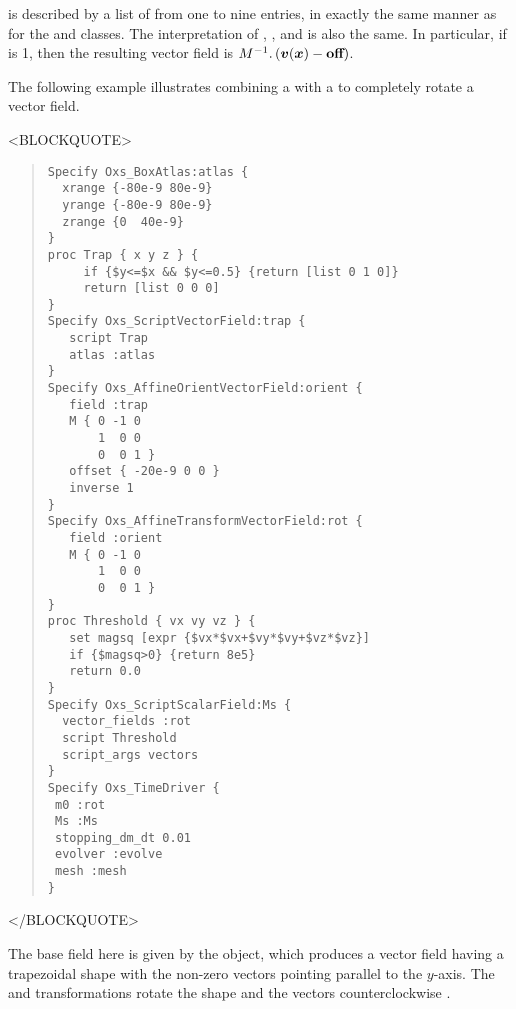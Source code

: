 \begin{description}
 is described by a list of from one to nine entries, in exactly
the same manner as for the
and
classes.  The
interpretation of , , and
 is also the same.  In particular, if
 is 1, then the resulting vector field is
$M^{-1}.\left(\mbox{\boldmath$v$}(\mbox{\boldmath$x$})-\textbf{off}\right)$.

The following example illustrates combining a
 with a
to completely rotate a vector field.
\begin{rawhtml}<BLOCKQUOTE>\end{rawhtml}
\begin{quote}
\begin{verbatim}
Specify Oxs_BoxAtlas:atlas {
  xrange {-80e-9 80e-9}
  yrange {-80e-9 80e-9}
  zrange {0  40e-9}
}
proc Trap { x y z } {
     if {$y<=$x && $y<=0.5} {return [list 0 1 0]}
     return [list 0 0 0]
}
Specify Oxs_ScriptVectorField:trap {
   script Trap
   atlas :atlas
}
Specify Oxs_AffineOrientVectorField:orient {
   field :trap
   M { 0 -1 0
       1  0 0
       0  0 1 }
   offset { -20e-9 0 0 }
   inverse 1
}
Specify Oxs_AffineTransformVectorField:rot {
   field :orient
   M { 0 -1 0
       1  0 0
       0  0 1 }
}
proc Threshold { vx vy vz } {
   set magsq [expr {$vx*$vx+$vy*$vy+$vz*$vz}]
   if {$magsq>0} {return 8e5}
   return 0.0
}
Specify Oxs_ScriptScalarField:Ms {
  vector_fields :rot
  script Threshold
  script_args vectors  
}
Specify Oxs_TimeDriver {
 m0 :rot
 Ms :Ms
 stopping_dm_dt 0.01
 evolver :evolve
 mesh :mesh
}\end{verbatim}
\end{quote}
\begin{rawhtml}</BLOCKQUOTE>\end{rawhtml}
The base field here is given by the 
object, which produces a vector field having a trapezoidal shape with
the non-zero vectors pointing parallel to the $y$-axis.  The
 and  transformations rotate the shape and the
vectors counterclockwise .

\end{description}
